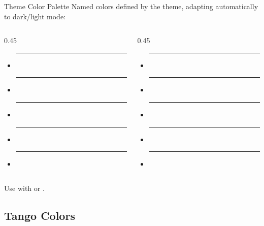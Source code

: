 \documentclass[presentation, aspectratio=169]{beamer}
\begin{document}
\begin{frame}{Theme Color Palette}
  Named colors defined by the theme, adapting automatically to dark/light mode:

  \vspace{0.4em}
  \begin{columns}
    \begin{column}{0.45\columnwidth}
      \begin{itemize}
        \item \textcolor{red}{\rule{1em}{1em}}~
        \item \textcolor{blue}{\rule{1em}{1em}}~
        \item \textcolor{green}{\rule{1em}{1em}}~
        \item \textcolor{orange}{\rule{1em}{1em}}~
        \item \textcolor{yellow}{\rule{1em}{1em}}~
      \end{itemize}
    \end{column}
    \begin{column}{0.45\columnwidth}
      \begin{itemize}
        \item \textcolor{plum}{\rule{1em}{1em}}~
        \item \textcolor{cyan}{\rule{1em}{1em}}~
        \item \textcolor{beige}{\rule{1em}{1em}}~
        \item \textcolor{petrol}{\rule{1em}{1em}}~
        \item \textcolor{darkgray}{\rule{1em}{1em}}~
      \end{itemize}
    \end{column}
  \end{columns}

  \vspace{0.4em}
  Use with  or .
\end{frame}

\subsection{Tango Colors}
\end{document}
